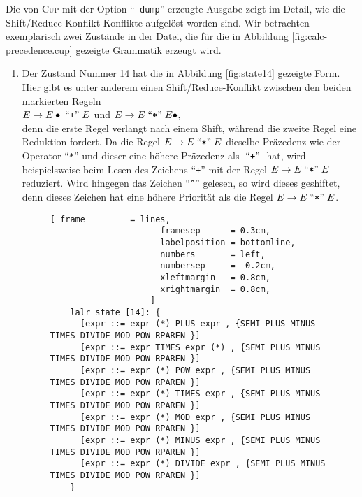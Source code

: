 Die von \textsc{Cup} mit der Option ``\texttt{-dump}'' erzeugte Ausgabe zeigt im Detail, wie die
Shift/Reduce-Konflikt Konflikte aufgel\"ost worden sind.  Wir betrachten exemplarisch zwei Zust\"ande in
der Datei, die f\"ur die in Abbildung \ref{fig:calc-precedence.cup} gezeigte Grammatik erzeugt wird.
\begin{enumerate}
\item Der Zustand Nummer 14 hat die in Abbildung \ref{fig:state14} gezeigte Form.
      Hier gibt es unter anderem einen Shift/Reduce-Konflikt zwischen den beiden markierten Regeln
      \\[0.2cm]
      \hspace*{1.3cm}
      $E \rightarrow E \bullet \;\mbox{``\texttt{+}''}\; E$ \quad und \quad
      $E \rightarrow E \;\mbox{``\texttt{*}''}\; E \bullet$, 
      \\[0.2cm]
      denn die erste Regel verlangt nach einem Shift, w\"ahrend die zweite Regel eine Reduktion fordert.
      Da die Regel $E \rightarrow E \;\mbox{``\texttt{*}''}\; E$ dieselbe Pr\"azedenz wie der Operator ``\texttt{*}''
      und dieser eine h\"ohere Pr\"azedenz als $\;\mbox{``\texttt{+}''}\;$ hat, wird beispielsweise beim Lesen des Zeichens
      ``\texttt{+}'' mit der Regel $E \rightarrow E \;\mbox{``\texttt{*}''}\; E$ reduziert.
      Wird hingegen das Zeichen ``\texttt{\^}'' gelesen, so wird dieses geshiftet, denn
      dieses Zeichen hat eine h\"ohere Priorit\"at als die Regel
       $E \rightarrow E \;\mbox{``\texttt{*}''}\; E$.
    \begin{figure}[!ht]
    \centering
    \begin{Verbatim}[ frame         = lines, 
                      framesep      = 0.3cm, 
                      labelposition = bottomline,
                      numbers       = left,
                      numbersep     = -0.2cm,
                      xleftmargin   = 0.8cm,
                      xrightmargin  = 0.8cm,
                    ]
    lalr_state [14]: {
      [expr ::= expr (*) PLUS expr , {SEMI PLUS MINUS TIMES DIVIDE MOD POW RPAREN }]
      [expr ::= expr TIMES expr (*) , {SEMI PLUS MINUS TIMES DIVIDE MOD POW RPAREN }]
      [expr ::= expr (*) POW expr , {SEMI PLUS MINUS TIMES DIVIDE MOD POW RPAREN }]
      [expr ::= expr (*) TIMES expr , {SEMI PLUS MINUS TIMES DIVIDE MOD POW RPAREN }]
      [expr ::= expr (*) MOD expr , {SEMI PLUS MINUS TIMES DIVIDE MOD POW RPAREN }]
      [expr ::= expr (*) MINUS expr , {SEMI PLUS MINUS TIMES DIVIDE MOD POW RPAREN }]
      [expr ::= expr (*) DIVIDE expr , {SEMI PLUS MINUS TIMES DIVIDE MOD POW RPAREN }]
    }


\end{Verbatim}
\end{figure}
\end{enumerate}
